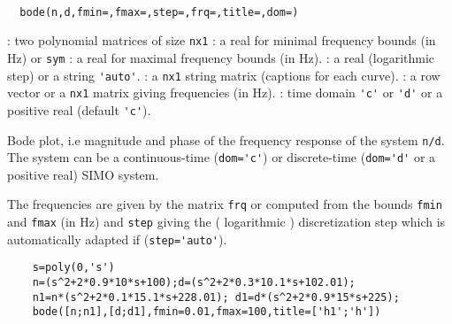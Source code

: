 \begin{mandesc}
  \\
\end{mandesc}
\begin{calling_sequence}
\begin{verbatim}
  bode(n,d,fmin=,fmax=,step=,frq=,title=,dom=)
\end{verbatim}
\end{calling_sequence}
\begin{parameters}
  \begin{varlist}
    : two polynomial matrices of size \verb!nx1!
    : a real for minimal frequency bounds (in Hz) or \verb!sym!
    : a real for maximal frequency bounds (in Hz).
    : a real (logarithmic step) or a string \verb!'auto'!.
    : a \verb!nx1! string matrix (captions for each curve).
    : a row vector or a \verb!nx1! matrix giving frequencies (in Hz).
    : time domain \verb!'c'! or \verb!'d'! or a positive real (default \verb!'c'!).
  \end{varlist}
\end{parameters}

\begin{mandescription}
  Bode plot, i.e magnitude and phase of the frequency response of the system
  \verb!n/d!. The system can be a continuous-time (\verb!dom='c'!) or
  discrete-time (\verb!dom='d'! or a positive real) SIMO system.

  The frequencies are given by the matrix \verb!frq! or computed from
  the bounds \verb!fmin! and \verb!fmax! (in Hz) and \verb!step! giving
  the ( logarithmic ) discretization step which is automatically adapted if
  (\verb!step='auto'!).
\end{mandescription}

\begin{examples}
  \begin{Verbatim}
    s=poly(0,'s')
    n=(s^2+2*0.9*10*s+100);d=(s^2+2*0.3*10.1*s+102.01);
    n1=n*(s^2+2*0.1*15.1*s+228.01); d1=d*(s^2+2*0.9*15*s+225);
    bode([n;n1],[d;d1],fmin=0.01,fmax=100,title=['h1';'h'])
  \end{Verbatim}
\end{examples}

\begin{manseealso}
\end{manseealso}
